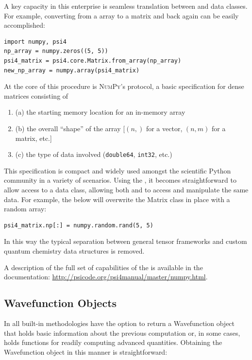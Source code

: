 \documentclass[%
  class = book,%
  crop = false,%
  float = true,%
  multi = true,%
  preview = false,%
]{standalone}
\let\cite\autocite
\begin{document}
A key capacity in this enterprise is seamless translation between \numpy and \pfour data classes. For example, converting from a \numpy array to a \pfour matrix and back again can be easily accomplished:

\begin{verbatim}
import numpy, psi4
np_array = numpy.zeros((5, 5))
psi4_matrix = psi4.core.Matrix.from_array(np_array)
new_np_array = numpy.array(psi4_matrix)
\end{verbatim}
At the core of this procedure is \textsc{NumPy}'s \arrayint \cite{array_interface} protocol, a basic specification for dense matrices consisting of
\begin{enumerate}
\item (a) the starting memory location for an in-memory array
\item (b) the overall ``shape'' of the array [\((n,)\) for a vector, \((n,m)\) for a matrix, etc.]
\item (c) the type of data involved (\texttt{double64}, \texttt{int32}, etc.)
\end{enumerate}
This specification is compact and widely used amongst the scientific Python community in a variety of scenarios. Using the \arrayint, it becomes straightforward to allow \numpy access to a \pfour data class, allowing both \pfour and \numpy to access and manipulate the same data. For example, the below will overwrite the \pfour Matrix class in place with a random \numpy array:

\begin{verbatim}
psi4_matrix.np[:] = numpy.random.rand(5, 5)
\end{verbatim}
In this way the typical separation between general tensor frameworks and custom quantum chemistry data structures is removed.

A description of the full set of capabilities of the \arrayint is available in the \pfour documentation: \url{http://psicode.org/psi4manual/master/numpy.html}.

\subsection{Wavefunction Objects}

In \pfour all built-in methodologies have the option to return a Wavefunction object that holds basic information about the previous computation or, in some cases, holds functions for readily computing advanced quantities. Obtaining the Wavefunction object in this manner is straightforward:
\end{document}
